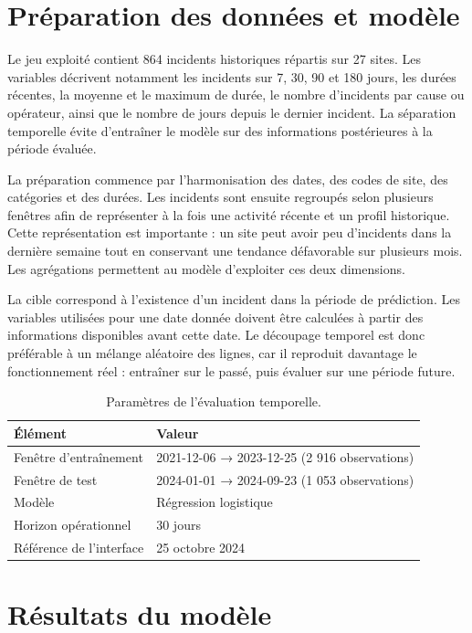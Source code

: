 \documentclass[12pt,a4paper,oneside]{report}
\begin{document}
\section{Préparation des données et modèle}

Le jeu exploité contient 864 incidents historiques répartis sur 27 sites. Les variables décrivent notamment les incidents sur 7, 30, 90 et 180 jours, les durées récentes, la moyenne et le maximum de durée, le nombre d’incidents par cause ou opérateur, ainsi que le nombre de jours depuis le dernier incident. La séparation temporelle évite d’entraîner le modèle sur des informations postérieures à la période évaluée.

La préparation commence par l’harmonisation des dates, des codes de site, des catégories et des durées. Les incidents sont ensuite regroupés selon plusieurs fenêtres afin de représenter à la fois une activité récente et un profil historique. Cette représentation est importante : un site peut avoir peu d’incidents dans la dernière semaine tout en conservant une tendance défavorable sur plusieurs mois. Les agrégations permettent au modèle d’exploiter ces deux dimensions.

La cible correspond à l’existence d’un incident dans la période de prédiction. Les variables utilisées pour une date donnée doivent être calculées à partir des informations disponibles avant cette date. Le découpage temporel est donc préférable à un mélange aléatoire des lignes, car il reproduit davantage le fonctionnement réel : entraîner sur le passé, puis évaluer sur une période future.

\begin{table}[H]
\centering
\small
\caption{Paramètres de l’évaluation temporelle.}
\begin{tabularx}{\textwidth}{B{4.0cm} X}
\toprule
Élément & Valeur\\
\midrule
Fenêtre d’entraînement & 2021-12-06 → 2023-12-25 (2 916 observations)\\
Fenêtre de test & 2024-01-01 → 2024-09-23 (1 053 observations)\\
Modèle & Régression logistique\\
Horizon opérationnel & 30 jours\\
Référence de l’interface & 25 octobre 2024\\
\bottomrule
\end{tabularx}
\end{table}

\section{Résultats du modèle}
\end{document}
